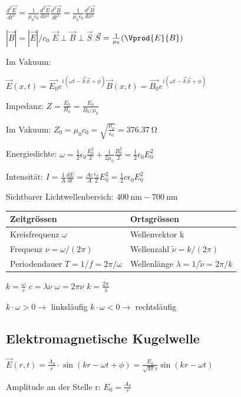 \documentclass[10pt,a4paper]{scrartcl}
\begin{document}
\begin{multicols*}{3}
	$\frac{d^2\vec{E}}{dt^2}=\frac{1}{\mu_0\epsilon_0}\frac{d^2\vec{E}}{dx^2}$\hfill$\frac{d^2\vec{B}}{dt^2}=\frac{1}{\mu_0\epsilon_0}\frac{d^2\vec{B}}{dx^2}$
	
	$|\vec{B}|=|\vec{E}|/c_0$ \hfill $\vec{E}\perp\vec{B}\perp\vec{S}$ \hfill $\vec{S}=\frac{1}{\mu_0}(\Vprod{E}{B})$
	
	Im Vakuum:
	
	$\vec{E}(x,t)=\vec{E_0}e^{i(\omega t-\vec{k}\vec{x}+\phi)}$\hfill$\vec{B}(x,t)=\vec{B_0}e^{i(\omega t-\vec{k}\vec{x}+\phi)}$
	
	Impedanz: $Z=\frac{E_0}{H_0}=\frac{E_0}{B_0/\mu_0}$
	
	Im Vakuum: $Z_0=\mu_0c_0=\sqrt{\frac{\mu_0}{\epsilon_0}}=\SI{376.37}{\ohm}$
	
	Energiedichte: $\omega=\frac{1}{2}\epsilon_0\frac{E_0^2}{2}+\frac{1}{2\mu_0}\frac{B_0^2}{2}=\frac{1}{2}\epsilon_0E_0^2$
	
	Intensität: $I=\frac{1}{A}\frac{dE}{dt}=\frac{Ac}{A}\frac{\epsilon_0}{2}E_0^2=\frac{1}{2}c\epsilon_0E_0^2$
	
	Sichtbarer Lichtwellenbereich: $\SI{400}{\nano\meter}-\SI{700}{\nano\meter}$
	
	\begin{tabulary}{\linewidth}{L|L}
	\hline
	Zeitgrössen&Ortsgrössen\\
	\hline
	Kreisfrequenz $\omega$ &Wellenvektor k\\
	\hline
	Frequenz $\nu =\omega / (2\pi)$ &Wellenzahl $\tilde{\nu} =k/(2\pi)$\\
	\hline
	Periodendauer $T = 1/f=2\pi / \omega$&Wellenlänge $\lambda=1/ \tilde{\nu} =2\pi /k$\\
	\hline
	\end{tabulary}

	\vspace{1ex}
	
	$k=\frac{\omega}{c}$ \hfill $c=\lambda \nu$ \hfill $\omega=2\pi\nu$ \hfill $k=\frac{2\pi}{\lambda}$
	
	$k\cdot \omega >0 \rightarrow$ linksläufig \hfill $k\cdot \omega <0\rightarrow$ rechtsläufig
	
	\subsection{Elektromagnetische Kugelwelle}
	
	$\vec{E}(r,t)=\frac{A_0}{r}\cdot\sin(kr-\omega t +\phi)=\frac{E_0}{\sqrt{4\pi}r}\sin(kr-\omega t)$
	
	Amplitude an der Stelle r: $E_0=\frac{A_0}{r}$
	

\end{multicols*}
\end{document}
